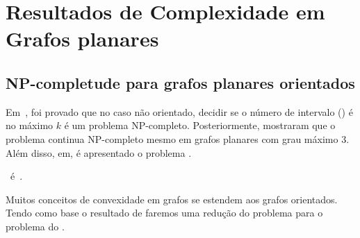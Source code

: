 \chapter{Resultados de Complexidade em Grafos planares}\label{5-complexidade}

\section{NP-completude para grafos planares orientados}

Em~\cite{CENTENO200911}, foi provado que no caso não orientado, decidir se o número de intervalo () é no máximo $k$ é um problema NP-completo. Posteriormente,\cite{PENSO201583} mostraram que o problema continua NP-completo mesmo em grafos planares com grau máximo 3. Além disso, em\cite{PENSO201583}, é apresentado o problema \sam.

\vspace{5pt}


\begin{theorem}
    \sam~é~\npc.
\end{theorem}

Muitos conceitos de convexidade em grafos se estendem aos grafos orientados. Tendo como base o resultado de \cite{PENSO201583} faremos uma redução do problema \sam para o problema do \ind.


